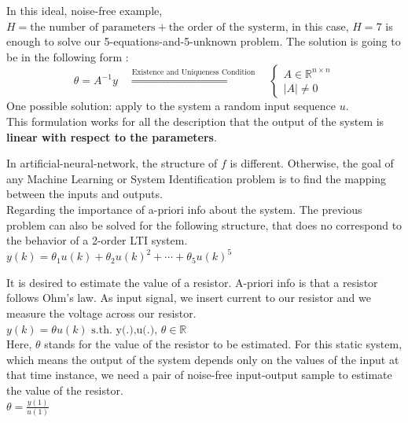 In this ideal, noise-free example, \(H = \text{the number of parameters} + \text{the order of the systerm}\), in this case, \(H = 7\) is enough to solve our 5-equations-and-5-unknown problem. The solution is going to be in the following form
:\\
\begin{equation}
    \theta = A^{-1} y
    \quad \overset{\text{Existence and Uniqueness Condition}}{\Rightarrow} \quad
    \begin{cases}
        
        A \in \mathbb{R}^{n \times n} \\
        \left|A\right| \neq 0
        
    \end{cases}
\end{equation}
One possible solution: apply to the system a random input sequence \(u\).\\

This formulation works for all the description that the output of the system is \textbf{linear with respect to the parameters}.

\begin{factbox}
    In artificial-neural-network, the structure of \(f\) is different. Otherwise, the goal of any Machine Learning or System Identification problem is to find the mapping between the inputs and outputs.\\
    Regarding the importance of a-priori info about the system. The previous problem can also be solved for the following structure, that does no correspond to the behavior of a 2-order LTI system.
    \(y(k) = \theta_1 u(k) + \theta_2 u(k)^2 + \cdots + \theta_5 u(k)^5\)
\end{factbox}

\begin{example}[Example]
    It is desired to estimate the value of a resistor. A-priori info is that a resistor follows Ohm's law. As input signal, we insert current to our resistor and we measure the voltage across our resistor. \\
    
    \(y(k) = \theta u(k) \text{ s.th. y(.),u(.), }\theta \in \mathbb{R}\)\\
  
Here, \(\theta\) stands for the value of the resistor to be estimated. For this static system, which means the output of the system depends only on the values of the input at that time instance, we need a pair of noise-free input-output sample to estimate the value of the resistor. \\

\(\theta = \frac{y(1)}{u(1)}\)\\
\end{example}

